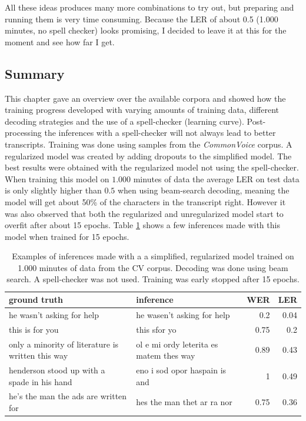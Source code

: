 All these ideas produces many more combinations to try out, but preparing and running them is very time consuming. Because the \ac{LER} of about 0.5 (1.000 minutes, no spell checker) looks promising, I decided to leave it at this for the moment and see how far I get.

\subsection{Summary}

This chapter gave an overview over the available corpora and showed how the training progress developed with varying amounts of training data, different decoding strategies and the use of a spell-checker (learning curve). Post-processing the inferences with a spell-checker will not always lead to better transcripts. Training was done using samples from the \textit{CommonVoice} corpus. A regularized model was created by adding dropouts to the simplified model. The best results were obtained with the regularized model not using the spell-checker.  When training this model on $1.000$ minutes of data the average \ac{LER} on test data is only slightly higher than $0.5$ when using beam-search decoding, meaning the model will get about 50\% of the characters in the transcript right. However it was also observed that both the regularized and unregularized model start to overfit after about 15 epochs. Table \ref{inference_samples} shows a few inferences made with this model when trained for 15 epochs.

\begin{table}[h!]
	\centering
	\begin{tabular}{llrr}
		\toprule
		ground truth & inference & \ac{WER} & \ac{LER} \\
		\midrule
		he wasn't asking for help & he wasen't asking for help & 0.2 & 0.04 \\
		this is for you & this sfor yo & 0.75 & 0.2 \\
		only a minority of literature is written this way & ol e mi ordy leterita es matem thes way & 0.89 & 0.43 \\
		henderson stood up with a spade in his hand	& eno i sod opor haspain is and & 1 & 0.49 \\	
		he's the man the ads are written for & hes the man thet ar ra nor & 0.75 & 0.36 \\
		\bottomrule
	\end{tabular}
	\caption{Examples of inferences made with a a simplified, regularized model trained on 1.000 minutes of data from the \ac{CV} corpus. Decoding was done using beam search. A spell-checker was not used. Training was early stopped after 15 epochs.}
	\label{inference_samples}
\end{table}